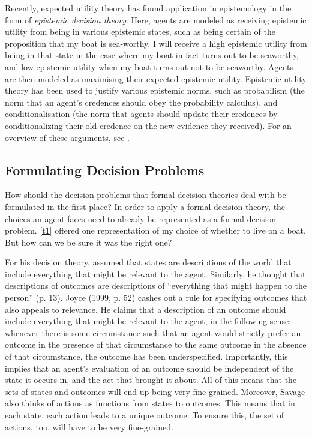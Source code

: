 Recently, expected utility theory has found application in epistemology in the form of {\em epistemic decision theory}. Here, agents are modeled as receiving epistemic utility from being in various epistemic states, such as being certain of the proposition that my boat is sea-worthy. I will receive a high epistemic utility from being in that state in the case where my boat in fact turns out to be seaworthy, and low epistemic utility when my boat turns out not to be seaworthy. Agents are then modeled as maximising their expected epistemic utility. Epistemic utility theory has been used to justify various epistemic norms, such as probabilism (the norm that an agent's credences should obey the probability calculus), and conditionalisation (the norm that agents should update their credences by conditionalizing their old credence on the new evidence they received). For an overview of these arguments, see \citet{Pettigrew2011}.

\subsection{Formulating Decision Problems}\label{subs14}

How should the decision problems that formal decision theories deal with be formulated in the first place? In order to apply a formal decision theory, the choices an agent faces need to already be represented as a formal decision problem. \autoref{t1} offered one representation of my choice of whether to live on a boat. But how can we be sure it was the right one?

For his decision theory, \citet{Savage1954} assumed that states are descriptions of the world that include everything that might be relevant to the agent. Similarly, he thought that descriptions of outcomes are descriptions of ``everything that might happen to the person'' (p. 13). Joyce (1999, p. 52) cashes out a rule for specifying outcomes that also appeals to relevance. He claims that a description of an outcome should include everything that might be relevant to the agent, in the following sense: whenever there is some circumstance such that an agent would strictly prefer an outcome in the presence of that circumstance to the same outcome in the absence of that circumstance, the outcome has been underspecified. Importantly, this implies that an agent's evaluation of an outcome should be independent of the state it occurs in, and the act that brought it about. All of this means that the sets of states and outcomes will end up being very fine-grained. Moreover, Savage also thinks of actions as functions from states to outcomes. This means that in each state, each action leads to a unique outcome. To ensure this, the set of actions, too, will have to be very fine-grained.


